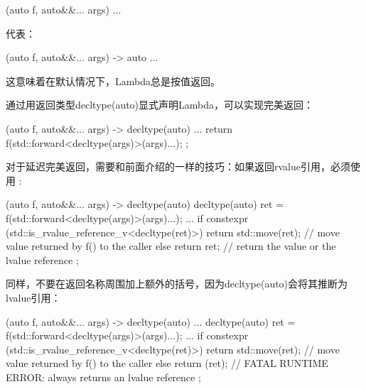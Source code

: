 \begin{cppcode}
[] (auto f, auto&&... args) {
	...
}
\end{cppcode}

代表：

\begin{cppcode}
[] (auto f, auto&&... args) -> auto {
	...
}
\end{cppcode}

这意味着在默认情况下，Lambda总是按值返回。

通过用返回类型decltype(auto)显式声明Lambda，可以实现完美返回：

\begin{cppcode}
[] (auto f, auto&&... args) -> decltype(auto) {
	...
	return f(std::forward<decltype(args)>(args)...);
};
\end{cppcode}

对于延迟完美返回，需要和前面介绍的一样的技巧：如果返回rvalue引用，必须使用 :

\begin{cppcode}
[] (auto f, auto&&... args) -> decltype(auto) {
	decltype(auto) ret = f(std::forward<decltype(args)>(args)...);
	...
	if constexpr (std::is_rvalue_reference_v<decltype(ret)>) {
		return std::move(ret); // move value returned by f() to the caller
	}
	else {
		return ret; // return the value or the lvalue reference
	}
};
\end{cppcode}

同样，不要在返回名称周围加上额外的括号，因为decltype(auto)会将其推断为lvalue引用：

\begin{cppcode}
[] (auto f, auto&&... args) -> decltype(auto) {
	...
	decltype(auto) ret = f(std::forward<decltype(args)>(args)...);
	...
	if constexpr (std::is_rvalue_reference_v<decltype(ret)>) {
		return std::move(ret); // move value returned by f() to the caller
	}
	else {
		return (ret); // FATAL RUNTIME ERROR: always returns an lvalue reference
	}
};
\end{cppcode}










